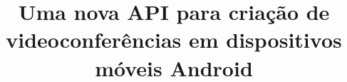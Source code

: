 \documentclass{acm_proc_article-sp}
\begin{document}
\title{Uma nova API para criação de videoconferências em dispositivos móveis Android}
%
%
%
%
%
\end{document}
